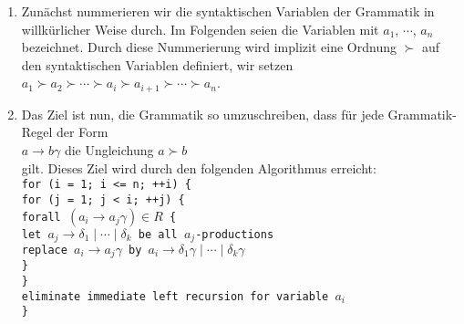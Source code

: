 \begin{enumerate}
\item Zun\"achst nummerieren wir die syntaktischen Variablen der Grammatik in willk\"urlicher Weise durch.
      Im Folgenden seien die Variablen mit $a_1$, $\cdots$, $a_n$ bezeichnet.  Durch diese
      Nummerierung wird implizit eine Ordnung $\succ$ auf den syntaktischen Variablen
      definiert, wir setzen
      \\[0.2cm]
      \hspace*{1.3cm}
      $a_1 \succ a_2 \succ \cdots \succ a_i \succ a_{i+1} \succ \cdots \succ a_n$.
\item Das Ziel ist nun, die Grammatik so umzuschreiben, dass f\"ur jede
      Grammatik-Regel der Form
      \\[0.2cm]
      \hspace*{1.3cm}
      $a \rightarrow b \gamma$ \quad die Ungleichung \quad $a \succ b$
      \\[0.2cm]
      gilt.  Dieses Ziel wird durch den folgenden Algorithmus erreicht:
      \\[0.2cm]
      \hspace*{1.3cm}
      \texttt{for (i = 1; i <= n; ++i) \{}  \\[0.1cm]
      \hspace*{1.8cm}
      \texttt{for (j = 1; j < i; ++j) \{} \\[0.1cm]
      \hspace*{2.3cm}
      \texttt{forall $(a_i \rightarrow a_j\gamma) \in R$ \{} \\[0.1cm]
      \hspace*{2.8cm}
      \texttt{let $a_j \rightarrow \delta_1 \;|\; \cdots \;|\; \delta_k$ be all $a_j$-productions } \\[0.1cm]
      \hspace*{2.8cm}
      \texttt{replace $a_i \rightarrow a_j\gamma$ by $a_i \rightarrow \delta_1 \gamma \;|\;\cdots\;|\;\delta_k \gamma$} \\[0.1cm]
      \hspace*{2.3cm} 
      \texttt{\}}  \\[0.1cm]
      \hspace*{1.8cm} 
      \texttt{\}}  \\[0.1cm]
      \hspace*{1.8cm} 
      \texttt{eliminate immediate left recursion for variable $a_i$}  \\
      \hspace*{1.3cm} 
      \texttt{\}}  
\end{enumerate}
